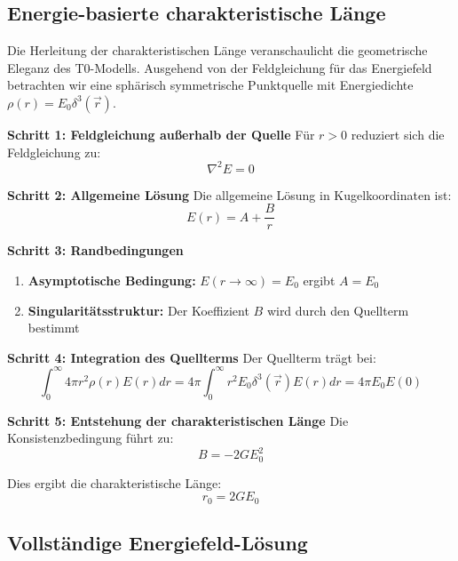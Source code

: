 \documentclass[12pt,a4paper]{report}
\newcommand{\rzero}{r_0}                  %
\begin{document}
	\subsection{Energie-basierte charakteristische Länge}\label{subsec:energy_based_length}
	
	Die Herleitung der charakteristischen Länge veranschaulicht die geometrische Eleganz des T0-Modells. Ausgehend von der Feldgleichung für das Energiefeld betrachten wir eine sphärisch symmetrische Punktquelle mit Energiedichte $\rho(r) = E_0 \delta^3(\vec{r})$.
	
	\textbf{Schritt 1: Feldgleichung außerhalb der Quelle}
	Für $r > 0$ reduziert sich die Feldgleichung zu:
	\begin{equation}
		\nabla^2 E = 0
		\label{eq:laplace_outside}
	\end{equation}
	
	\textbf{Schritt 2: Allgemeine Lösung}
	Die allgemeine Lösung in Kugelkoordinaten ist:
	\begin{equation}
		E(r) = A + \frac{B}{r}
		\label{eq:general_solution}
	\end{equation}
	
	\textbf{Schritt 3: Randbedingungen}
	\begin{enumerate}
		\item \textbf{Asymptotische Bedingung:} $E(r \to \infty) = E_0$ ergibt $A = E_0$
		\item \textbf{Singularitätsstruktur:} Der Koeffizient $B$ wird durch den Quellterm bestimmt
	\end{enumerate}
	
	\textbf{Schritt 4: Integration des Quellterms}
	Der Quellterm trägt bei:
	\begin{equation}
		\int_0^{\infty} 4\pi r^2 \rho(r) E(r) dr = 4\pi \int_0^{\infty} r^2 E_0 \delta^3(\vec{r}) E(r) dr = 4\pi E_0 E(0)
	\end{equation}
	
	\textbf{Schritt 5: Entstehung der charakteristischen Länge}
	Die Konsistenzbedingung führt zu:
	\begin{equation}
		B = -2GE_0^2
	\end{equation}
	
	Dies ergibt die charakteristische Länge:
	\begin{equation}
		\boxed{\rzero = 2GE_0}
	\end{equation}
	
	\subsection{Vollständige Energiefeld-Lösung}\label{subsec:complete_solution}
	
\end{document}
